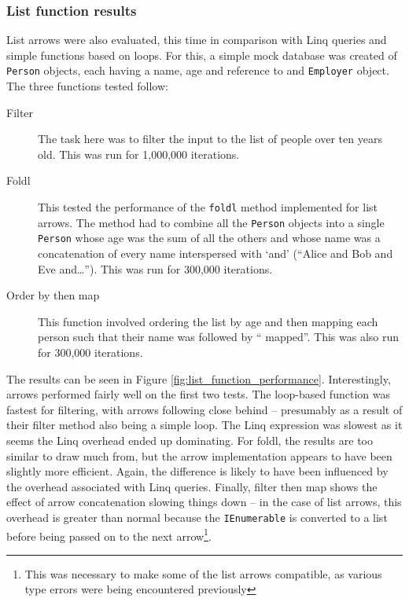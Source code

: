 \documentclass[12pt,twoside,notitlepage]{report}
\begin{document}
\subsubsection{List function results}

List arrows were also evaluated, this time in comparison with Linq queries and simple functions based on loops. For this, a simple mock database was created of \texttt{Person} objects, each having a name, age and reference to and \texttt{Employer} object. The three functions tested follow:

\begin{description}
	\item[Filter] The task here was to filter the input to the list of people over ten years old. This was run for 1,000,000 iterations.
	\item[Foldl] This tested the performance of the \texttt{foldl} method implemented for list arrows. The method had to combine all the \texttt{Person} objects into a single \texttt{Person} whose age was the sum of all the others and whose name was a concatenation of every name interspersed with `and' (``Alice and Bob and Eve and\ldots''). This was run for 300,000 iterations.
	\item[Order by then map] This function involved ordering the list by age and then mapping each person such that their name was followed by `` mapped''. This was also run for 300,000 iterations.
\end{description}

The results can be seen in Figure \ref{fig:list_function_performance}. Interestingly, arrows performed fairly well on the first two tests. The loop-based function was fastest for filtering, with arrows following close behind -- presumably as a result of their filter method also being a simple loop. The Linq expression was slowest as it seems the Linq overhead ended up dominating. For foldl, the results are too similar to draw much from, but the arrow implementation appears to have been slightly more efficient. Again, the difference is likely to have been influenced by the overhead associated with Linq queries. Finally, filter then map shows the effect of arrow concatenation slowing things down -- in the case of list arrows, this overhead is greater than normal because the \texttt{IEnumerable} is converted to a list before being passed on to the next arrow\footnote{This was necessary to make some of the list arrows compatible, as various type errors were being encountered previously}.
\end{document}

